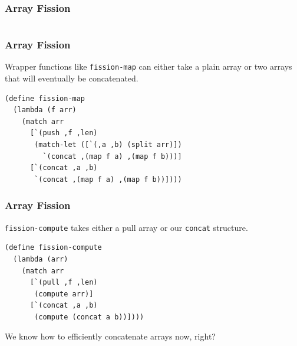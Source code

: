 \documentclass[12pt,letterpaper]{beamer}
\begin{document}
\begin{frame}[fragile]
\frametitle{Array Fission}
\begin{columns}[c]
\begin{column}[c]{5cm}

\end{column}
\begin{column}[c]{5cm}
\end{column}
\end{columns}
\end{frame}

\begin{frame}[fragile]
\frametitle{Array Fission}
Wrapper functions like {\tt fission-map} can either take
a plain array or two arrays that will eventually be concatenated.
\begin{lstlisting}
(define fission-map
  (lambda (f arr)
    (match arr
      [`(push ,f ,len)
       (match-let ([`(,a ,b) (split arr)])
         `(concat ,(map f a) ,(map f b)))]
      [`(concat ,a ,b)
       `(concat ,(map f a) ,(map f b))])))
\end{lstlisting}
\end{frame}

\begin{frame}[fragile]
\frametitle{Array Fission}
{\tt fission-compute} takes either a pull array
or our {\tt concat} structure.
\begin{lstlisting}
(define fission-compute
  (lambda (arr)
    (match arr
      [`(pull ,f ,len)
       (compute arr)]
      [`(concat ,a ,b)
       (compute (concat a b))])))
\end{lstlisting}
We know how to efficiently concatenate arrays now, right?
\end{frame}
\end{document}
